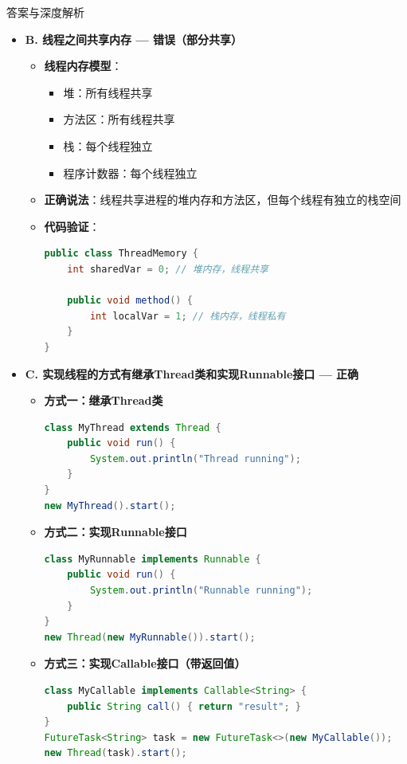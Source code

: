 \documentclass[12pt, a4paper]{ctexart}
\begin{document}
\begin{enumerate}[label=\textbf{\arabic*.}]
\begin{bluebox}{答案与深度解析}
\begin{itemize}[label={}, leftmargin=*, nosep]
		      \item \textbf{B. 线程之间共享内存 — 错误（部分共享）}
		      \begin{itemize}[label={}, leftmargin=*, nosep]
			      \item \textbf{线程内存模型}：
			            \begin{itemize}[label={}, nosep]
				            \item 堆：所有线程共享
				            \item 方法区：所有线程共享
				            \item 栈：每个线程独立
				            \item 程序计数器：每个线程独立
			            \end{itemize}
			      \item \textbf{正确说法}：线程共享进程的堆内存和方法区，但每个线程有独立的栈空间
			      \item \textbf{代码验证}：
			            \begin{lstlisting}[language=Java]
public class ThreadMemory {
    int sharedVar = 0; // 堆内存，线程共享
    
    public void method() {
        int localVar = 1; // 栈内存，线程私有
    }
}
      \end{lstlisting}
		      \end{itemize}

		      \item \textbf{C. 实现线程的方式有继承Thread类和实现Runnable接口 — 正确}
		      \begin{itemize}[label={}, leftmargin=*, nosep]
			      \item \textbf{方式一：继承Thread类}
			            \begin{lstlisting}[language=Java]
class MyThread extends Thread {
    public void run() {
        System.out.println("Thread running");
    }
}
new MyThread().start();
      \end{lstlisting}
			      \item \textbf{方式二：实现Runnable接口}
			            \begin{lstlisting}[language=Java]
class MyRunnable implements Runnable {
    public void run() {
        System.out.println("Runnable running");
    }
}
new Thread(new MyRunnable()).start();
      \end{lstlisting}
			      \item \textbf{方式三：实现Callable接口（带返回值）}
			            \begin{lstlisting}[language=Java]
class MyCallable implements Callable<String> {
    public String call() { return "result"; }
}
FutureTask<String> task = new FutureTask<>(new MyCallable());
new Thread(task).start();
      \end{lstlisting}
		      \end{itemize}


\end{itemize}
\end{bluebox}
\end{enumerate}
\end{document}
